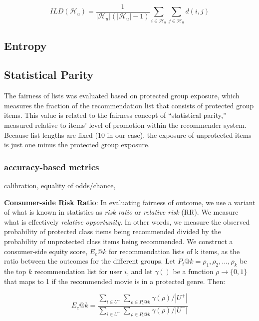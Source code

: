         \begin{equation}
            ILD(\mathcal{H}_u) = \frac{1}{|\mathcal{H}_u|(|\mathcal{H}_u|-1)}\sum_{i \in \mathcal{H}_u}\sum_{j \in \mathcal{H}_u}d(i,j)
        \end{equation}

        
        
        \subsection{Entropy}
        
        \subsection{Statistical Parity}
        The fairness of lists was evaluated based on protected group exposure, which measures the fraction of the recommendation list that consists of protected group items. This value is related to the fairness concept of ``statistical parity,'' measured relative to items' level of promotion within the recommender system. Because list lengths are fixed (10 in our case), the exposure of unprotected items is just one minus the protected group exposure.
        
        
        \subsubsection{accuracy-based metrics}
        calibration, equality of odds/chance, 
        
        
        \textbf{Consumer-side Risk Ratio}: In evaluating fairness of outcome, we use a variant of what is known in statistics as \textit{risk ratio} or \textit{relative risk} (RR)\cite{romei2014multidisciplinary}. We measure what is effectively \textit{relative opportunity}. In other words, we measure the observed probability of protected class items being recommended divided by the probability of unprotected class items being recommended.
        We construct a consumer-side equity score, $E_c@k$ for recommendation lists of k items, as the ratio between the outcomes for the different groups. Let $P_i@k = {\rho_1, \rho_2, ..., \rho_k}$ be the top $k$ recommendation list for user $i$, and let $\gamma()$ be a function $\rho \rightarrow \{0,1\}$ that maps to 1 if the recommended movie is in a protected genre. Then:

        \begin{equation}
        E_c@k=\frac{\sum_{i \in U^+}{\sum_{\rho \in P_i@k}{\gamma(\rho)}}/|U^+|}
        {\sum_{i \in U^-}{\sum_{\rho \in P_i@k}{\gamma(\rho)}}/|U^-|}
        \end{equation}
        
